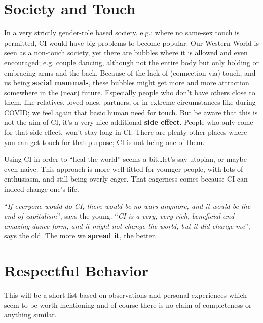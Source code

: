 \section{Society and Touch}\label{sec:society-and-touch}

In a very strictly gender-role based society, e.g.: where no same-sex touch is permitted, CI would have big problems to become popular.
Our Western World is seen as a non-touch society, yet there are bubbles where it is allowed and even encouraged; e.g. couple dancing, although not the entire body but only holding or embracing arms and the back.
Because of the lack of (connection via) touch, and us being \textbf{social mammals}, these bubbles might get more and more attraction somewhere in the (near) future.
Especially people who don't have others close to them, like relatives, loved ones, partners, or in extreme circumstances like during COVID; we feel again that basic human need for touch.
But be aware that this is not the aim of CI, it's a very nice additional \textbf{side effect}.
People who only come for that side effect, won't stay long in CI\@.
There are plenty other places where you can get touch for that purpose; CI is not being one of them.

Using CI in order to ``heal the world'' seems a bit\ldots let's say utopian, or maybe even naive.
This approach is more well-fitted for younger people, with lots of enthusiasm, and still being overly eager.
That eagerness comes because CI can indeed change one's life.

``\textit{If everyone would do CI, there would be no wars anymore, and it would be the end of capitalism}'', says the young.
``\textit{CI is a very, very rich, beneficial and amazing dance form, and it might not change the world, but it did change me}'', says the old.
The more we \textbf{spread it}, the better.

\section{Respectful Behavior}\label{sec:respectful-behavior}

This will be a short list based on observations and personal experiences which seem to be worth mentioning and of course there is no claim of completeness or anything similar.

